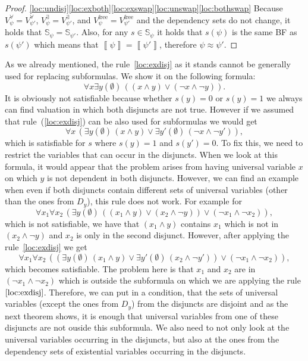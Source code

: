 \documentclass[
  digital, %
  color,
  twoside, %
  table,   %
  nolof,     %
  nolot,     %
]{fithesis3}
\theoremstyle{definition}
\theoremstyle{remark}
\newcommand{\seman}[1]{\left\llbracket {#1} \right\rrbracket}
\newcommand{\evars}[1]{V_{#1}^{\exists}}
\newcommand{\uvars}[1]{V_{#1}^{\forall}}
\newcommand{\fvars}[1]{V_{#1}^{\mathrm{free}}}
\newcommand{\Scands}[1]{\mathbb{S}_{#1}}
\newcommand{\itholds}{\,}
\begin{document}
\begin{proof}
  \eqref{loc:undisj}\eqref{loc:exboth}\eqref{loc:exswap}\eqref{loc:unswap}\eqref{loc:bothswap} Because $\uvars{\psi} = \uvars{\psi'}$, $\evars{\psi} = \evars{\psi'}$, and $\fvars{\psi} = \fvars{\psi'}$ and the dependency sets do not change, it holds that $\Scands{\psi} = \Scands{\psi'}$. Also, for any $s \in \Scands{\psi}$ it holds that $s(\psi)$ is the same BF as $s(\psi')$ which means that $\seman{\psi} = \seman{\psi'}$, therefore $\psi \approx \psi'$.
\end{proof}

As we already mentioned, the rule~\eqref{loc:exdisj} as it stands cannot be generally used for replacing subformulas. We show it on the following formula:
\[\forall x \exists y(\emptyset) \itholds ((x \land y) \lor (\neg x \land \neg y)).\]
It is obviously not satisfiable because whether $s(y) = 0$ or $s(y) = 1$ we always can find valuation in which both disjuncts are not true. However if we assumed that rule~(\ref{loc:exdisj}) can be also used for subformulas we would get
\[\forall x \itholds (\exists y(\emptyset) \itholds (x \land y) \lor \exists y'(\emptyset) \itholds (\neg x \land \neg y')),\]
which is satisfiable for $s$ where $s(y) = 1$ and $s(y') = 0$. To fix this, we need to restrict the variables that can occur in the disjuncts. When we look at this formula, it would appear that the problem arises from having universal variable $x$ on which $y$ is not dependent in both disjuncts. However, we can find an example when even if both disjuncts contain different sets of universal variables (other than the ones from $D_y$), this rule does not work. For example for
\[\forall x_1 \forall x_2 \itholds (\exists y(\emptyset) \itholds ((x_1 \land y) \lor (x_2 \land \neg y)) \lor (\neg x_1 \land \neg x_2)),\]
which is not satisfiable, we have that $(x_1 \land y)$ contains $x_1$ which is not in $(x_2 \land \neg y)$ and $x_2$ is only in the second disjunct. However, after applying the rule~\eqref{loc:exdisj} we get
\[\forall x_1 \forall x_2 \itholds ((\exists y(\emptyset) \itholds (x_1 \land y) \lor \exists y'(\emptyset) \itholds (x_2 \land \neg y')) \lor (\neg x_1 \land \neg x_2)),\]
which becomes satisfiable. The problem here is that $x_1$ and $x_2$ are in $(\neg x_1 \land \neg x_2)$ which is outside the subformula on which we are applying the rule $\eqref{loc:exdisj}$. Therefore, we can put in a condition, that the sets of universal variables (except the ones from $D_y$) from the disjuncts are disjoint and as the next theorem shows, it is enough that universal variables from one of these disjuncts are not ouside this subformula. We also need to not only look at the universal variables occurring in the disjuncts, but also at the ones from the dependency sets of existential variables occurring in the disjuncts.
\end{document}
